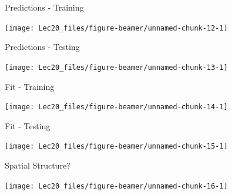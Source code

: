 \documentclass[11pt,ignorenonframetext,]{beamer}
\newenvironment{Shaded}{}{}
\newcommand{\CommentTok}[1]{\textcolor[rgb]{0.38,0.63,0.69}{\textit{#1}}}
\newcommand{\DataTypeTok}[1]{\textcolor[rgb]{0.56,0.13,0.00}{#1}}
\newcommand{\DecValTok}[1]{\textcolor[rgb]{0.25,0.63,0.44}{#1}}
\newcommand{\KeywordTok}[1]{\textcolor[rgb]{0.00,0.44,0.13}{\textbf{#1}}}
\newcommand{\NormalTok}[1]{#1}
\newcommand{\OperatorTok}[1]{\textcolor[rgb]{0.40,0.40,0.40}{#1}}
\newcommand{\StringTok}[1]{\textcolor[rgb]{0.25,0.44,0.63}{#1}}
\let\oldShaded\Shaded
\let\endoldShaded\endShaded
\renewenvironment{Shaded}{\footnotesize\begin{spacing}{0.9}\oldShaded}{\endoldShaded\end{spacing}}
\let\oldverbatim\verbatim
\let\endoldverbatim\endverbatim
\newcommand{\scriptoutput}{
  \renewenvironment{Shaded}{\scriptsize\begin{spacing}{0.9}\oldShaded}{\endoldShaded\end{spacing}}
  \renewenvironment{verbatim}{\scriptsize\begin{spacing}{0.9}\oldverbatim}{\endoldverbatim\end{spacing}}
}
\begin{document}
\begin{frame}{Predictions - Training}
\protect\hypertarget{predictions---training}{}

\begin{center}\texttt{[image: Lec20\_files/figure-beamer/unnamed-chunk-12-1]} \end{center}

\end{frame}

\begin{frame}{Predictions - Testing}
\protect\hypertarget{predictions---testing}{}

\begin{center}\texttt{[image: Lec20\_files/figure-beamer/unnamed-chunk-13-1]} \end{center}

\end{frame}

\begin{frame}{Fit - Training}
\protect\hypertarget{fit---training}{}

\scriptoutput

\begin{center}\texttt{[image: Lec20\_files/figure-beamer/unnamed-chunk-14-1]} \end{center}

\end{frame}

\begin{frame}{Fit - Testing}
\protect\hypertarget{fit---testing}{}

\scriptoutput

\begin{center}\texttt{[image: Lec20\_files/figure-beamer/unnamed-chunk-15-1]} \end{center}

\end{frame}

\begin{frame}[fragile]{Spatial Structure?}
\protect\hypertarget{spatial-structure}{}

\begin{Shaded}
\end{Shaded}

\begin{center}\texttt{[image: Lec20\_files/figure-beamer/unnamed-chunk-16-1]} \end{center}

\end{frame}
\end{document}
